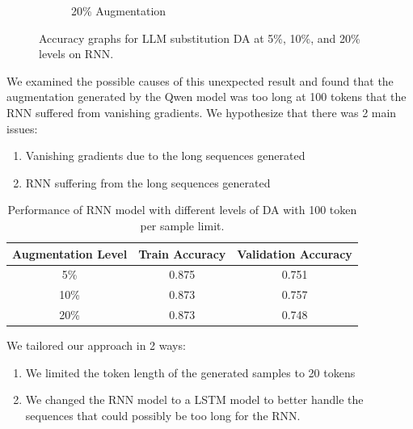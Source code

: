 \documentclass[10pt]{extarticle}
\begin{document}
\begin{figure}[ht]
\begin{subfigure}[b]{0.3\textwidth}
    \caption{20\% Augmentation}
    \label{fig:llm_20_rnn}
  \end{subfigure}
  \caption{Accuracy graphs for LLM substitution DA at 5\%, 10\%, and 20\% levels on RNN.}
  \label{fig:llm_rnn_substitution_accuracy}
\end{figure}

We examined the possible causes of this unexpected result and found that the
augmentation generated by the Qwen model was too long at 100 tokens that the
RNN suffered from vanishing gradients. We hypothesize that there was 2 main
issues:

\begin{enumerate}
  \item Vanishing gradients due to the long sequences generated
  \item RNN suffering from the long sequences generated
\end{enumerate}

\begin{table}[ht]
  \centering
  \begin{tabular}{|c|c|c|}
    \hline
    \textbf{Augmentation Level} & \textbf{Train Accuracy} & \textbf{Validation Accuracy} \\
    \hline
    5\%                         & 0.875                   & 0.751                        \\
    \hline
    10\%                        & 0.873                   & 0.757                        \\
    \hline
    20\%                        & 0.873                   & 0.748                        \\
    \hline
  \end{tabular}
  \caption{Performance of RNN model with different levels of DA with 100 token per sample limit.}
  \label{table:rnn_performance}
\end{table}

We tailored our approach in 2 ways:

\begin{enumerate}
  \item We limited the token length of the generated samples to 20 tokens
  \item We changed the RNN model to a LSTM model to better handle the sequences that
        could possibly be too long for the RNN.
\end{enumerate}
\end{document}
